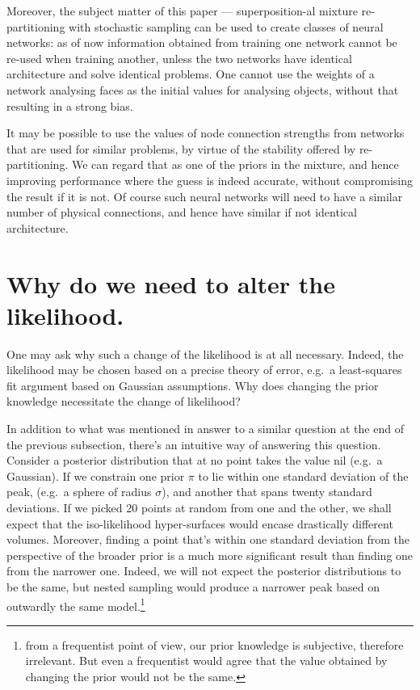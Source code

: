 \documentclass[usenatbib]{mnras}
\begin{document}
Moreover, the subject matter of this paper --- superposition-al
mixture re-partitioning with stochastic sampling can be used to
create classes of neural networks: as of now information obtained
from training one network cannot be re-used when training another,
unless the two networks have identical architecture and solve
identical problems. One cannot use the weights of a network
analysing faces as the initial values for analysing objects,
without that resulting in a strong bias.

It may be possible to use the values of node connection strengths
from networks that are used for similar problems, by virtue of the
stability offered by re-partitioning. We can regard that as one of
the priors in the mixture, and hence improving performance where
the guess is indeed accurate, without compromising the result if it
is not. Of course such neural networks will need to have a similar
number of physical connections, and hence have similar if not
identical architecture.

 

\appendix{}

\section{Why do we need to alter the likelihood.}\label{sec:org7c06a1b}
One may ask why such a change of the likelihood is at all
necessary. Indeed, the likelihood may be chosen based on a precise
theory of error, e.g.~a least-squares fit argument based on
Gaussian assumptions. Why does changing the prior knowledge
necessitate the change of likelihood?

In addition to what was mentioned in answer to a similar question
at the end of the previous subsection, there's an intuitive way of
answering this question. Consider a posterior distribution that at
no point takes the value nil (e.g.~a Gaussian). If we constrain
one prior \(\pi\) to lie within one standard deviation of the
peak, (e.g.~a sphere of radius \(\sigma\)), and another that spans
twenty standard deviations. If we picked 20 points at random from
one and the other, we shall expect that the iso-likelihood
hyper-surfaces would encase drastically different
volumes. Moreover, finding a point that's within one standard
deviation from the perspective of the broader prior is a much more
significant result than finding one from the narrower one. Indeed,
we will not expect the posterior distributions to be the same, but
nested sampling would produce a narrower peak based on outwardly
the same model.\footnote{from a frequentist point of view, our prior
knowledge is subjective, therefore irrelevant. But even a
frequentist would agree that the value obtained by changing the
prior would not be the same.}
\end{document}
